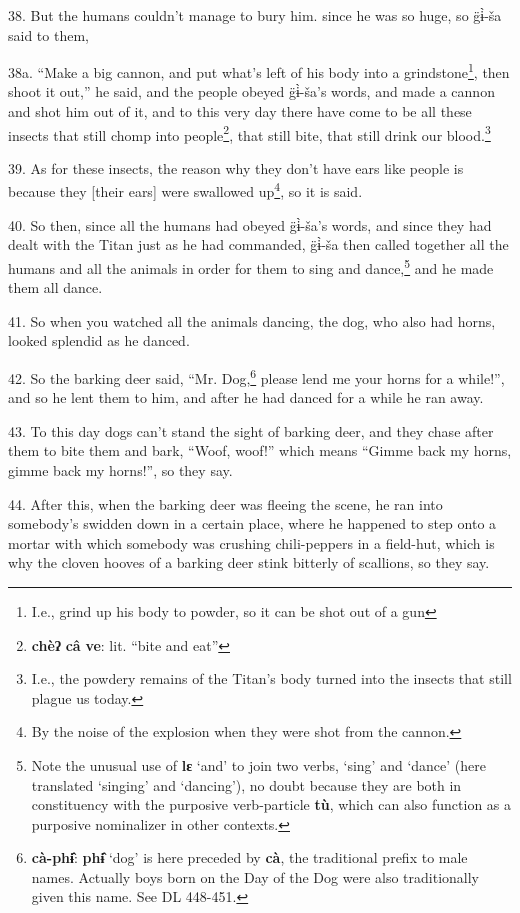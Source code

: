 38. But the humans couldn't manage to bury him. since he was so huge, so g̈ɨ̀-ša
said to them,

38a. ``Make a big cannon, and put what's left of his body into a grindstone\footnote{I.e., grind up his body to powder, so it can be shot out of a gun},
then shoot it out,'' he said, and the people obeyed g̈ɨ̀-ša's words, and made
a cannon and shot him out of it, and to this very day there have come to be all
these insects that still chomp into people\footnote{\textbf{chèʔ} \textbf{câ} \textbf{ve}: lit. ``bite and eat''}, that still bite, that still drink
our blood.\footnote{I.e., the powdery remains of the Titan's body turned into the insects that still plague us today.}

39. As for these insects, the reason why they don't have ears like people is because
they [their ears] were swallowed up\footnote{By the noise of the explosion when they were shot from the cannon.}, so it is said.

40. So then, since all the humans had obeyed g̈ɨ̀-ša's words, and since they
had dealt with the Titan just as he had commanded, g̈ɨ̀-ša then called together
all the humans and all the animals in order for them to sing and dance,\footnote{Note the unusual use of \textbf{lɛ} `and' to join two verbs, `sing' and `dance' (here translated `singing' and `dancing'), no doubt because they are both in constituency with the purposive verb-particle \textbf{tù}, which can also function as a purposive nominalizer in other contexts.} and
he made them all dance.

41. So when you watched all the animals dancing, the dog, who also had horns, looked
splendid as he danced.

42. So the barking deer said, ``Mr. Dog,\footnote{\textbf{cà-phɨ̂}: \textbf{phɨ̂} `dog' is here preceded by \textbf{cà}, the traditional prefix to male names. Actually boys born on the Day of the Dog were also traditionally given this name. See DL 448-451.} please lend me your horns for a while!'',
and so he lent them to him, and after he had danced for a while he ran away.

43. To this day dogs can't stand the sight of barking deer, and they chase after
them to bite them and bark, ``Woof, woof!'' which means ``Gimme back my horns,
gimme back my horns!'', so they say.

44. After this, when the barking deer was fleeing the scene, he ran into somebody's
swidden down in a certain place, where he happened to step onto a mortar with which
somebody was crushing chili-peppers in a field-hut, which is why the cloven hooves
of a barking deer stink bitterly of scallions, so they say.

